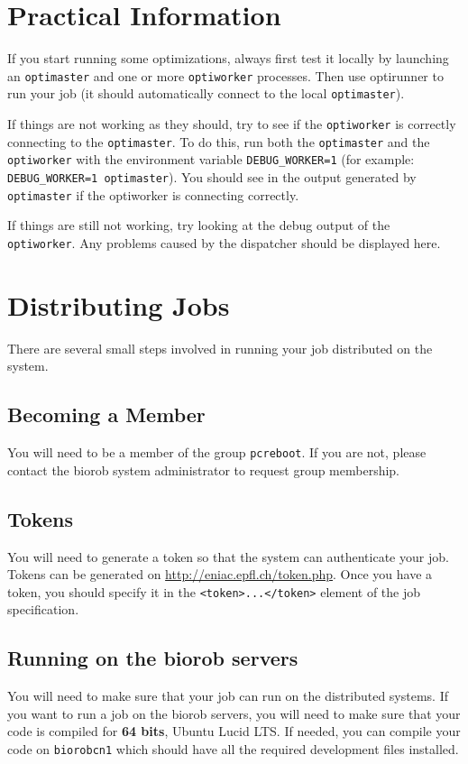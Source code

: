 \documentclass{report}
\begin{document}
\section{Practical Information}
If you start running some optimizations, always first test it locally by
launching an \verb!optimaster! and one or more \verb!optiworker! processes.
Then use optirunner to run your job (it should automatically connect to the
local \verb!optimaster!).

If things are not working as they should, try to see if the \verb!optiworker!
is correctly connecting to the \verb!optimaster!. To do this, run both the
\verb!optimaster! and the \verb!optiworker! with the environment variable
\verb!DEBUG_WORKER=1! (for example: \verb!DEBUG_WORKER=1 optimaster!). You
should see in the output generated by \verb!optimaster! if the optiworker is
connecting correctly.

If things are still not working, try looking at the debug output of the
\verb!optiworker!. Any problems caused by the dispatcher should be displayed
here.

\section{Distributing Jobs}
There are several small steps involved in running your job distributed on the
system.

\subsection{Becoming a Member}
You will need to be a member of the group \verb!pcreboot!. If you
are not, please contact the biorob system administrator to request group
membership.

\subsection{Tokens}
You will need to generate a token so that the system can authenticate
your job. Tokens can be generated on \url{http://eniac.epfl.ch/token.php}. Once
you have a token, you should specify it in the \verb!<token>...</token>! element
of the job specification.

\subsection{Running on the biorob servers}
You will need to make sure that your job can run on the distributed
systems. If you want to run a job on the biorob servers, you will need to make
sure that your code is compiled for \textbf{64 bits}, Ubuntu Lucid LTS.
If needed, you can compile your code on \verb!biorobcn1! which should have all
the required development files installed.
\end{document}
